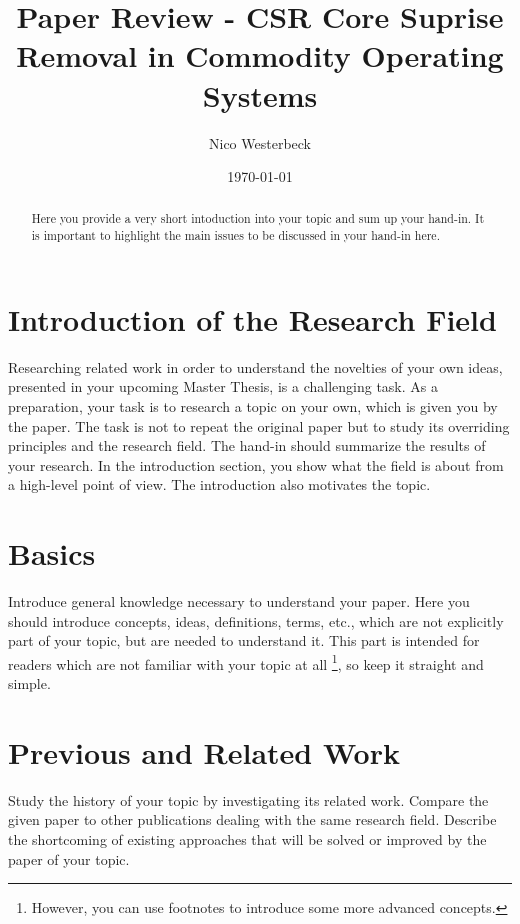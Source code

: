 \documentclass[a4paper,10pt,twoside]{article}
\title{Paper Review - CSR Core Suprise Removal in Commodity Operating Systems}
\author{Nico Westerbeck}
\date{\today}
\begin{document}
\maketitle

\begin{abstract}
Here you provide a very short intoduction into your topic and sum up your hand-in. 
It is important to highlight the main issues to be discussed in your hand-in here.
\end{abstract}

\tableofcontents

\section{Introduction of the Research Field}

Researching related work in order to understand the novelties of your own ideas, presented in your upcoming Master Thesis, is a challenging task. 
As a preparation, your task is to research a topic on your own, which is given you by the paper.
The task is not to repeat the original paper but to study its overriding principles and the research field.
The hand-in should summarize the results of your research.
In the introduction section, you show what the field is about from a high-level point of view.
The introduction also motivates the topic.

\section{Basics}

Introduce general knowledge necessary to understand your paper.
Here you should introduce concepts, ideas, definitions, terms, etc., which are not explicitly part of your topic, but are needed to understand it. 
This part is intended for readers which are not familiar with your topic at all
\footnote{However, you can use footnotes to introduce some more advanced concepts.}, so keep it straight and simple.

\section{Previous and Related Work}

Study the history of your topic by investigating its related work.
Compare the given paper to other publications dealing with the same research field.
Describe the shortcoming of existing approaches that will be solved or improved by the paper of your topic.
\end{document}
